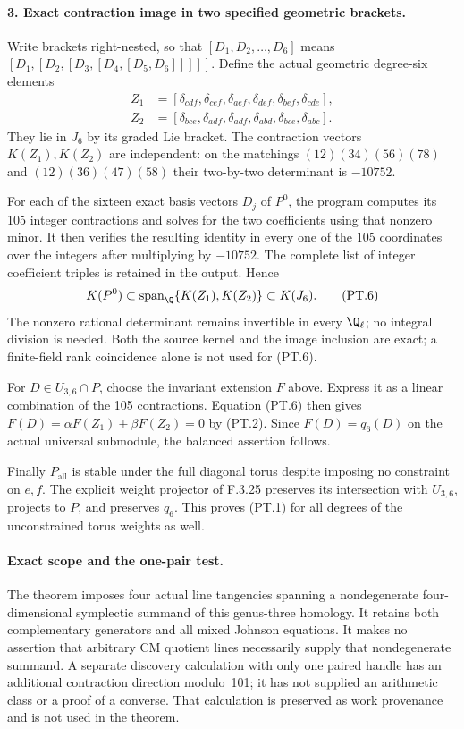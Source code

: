 \paragraph{3. Exact contraction image in two specified geometric brackets.}
Write brackets right-nested, so that
$[D_1,D_2,\ldots,D_6]$ means
$[D_1,[D_2,[D_3,[D_4,[D_5,D_6]]]]]$.
Define the actual geometric degree-six elements
\[
\begin{split}
 Z_1&=[\delta_{cdf},\delta_{cef},\delta_{aef},
          \delta_{def},\delta_{bef},\delta_{cde}],\\
 Z_2&=[\delta_{bce},\delta_{adf},\delta_{adf},
          \delta_{abd},\delta_{bce},\delta_{abc}].
\end{split}                                               \tag{PT.5}
\]
They lie in $J_6$ by its graded Lie bracket.
The contraction vectors $K(Z_1),K(Z_2)$ are
independent: on the matchings
$(12)(34)(56)(78)$ and $(12)(36)(47)(58)$
their two-by-two determinant is $-10752$.

For each of the sixteen exact basis vectors
$D_j$ of $P^0$, the program computes its
105 integer contractions and solves for the
two coefficients using that nonzero minor.
It then verifies the resulting identity in
every one of the 105 coordinates over the
integers after multiplying by $-10752$.
The complete list of integer coefficient
triples is retained in the output. Hence
\[
       K(P^0)\subset\operatorname{span}_{\Q}
                         \{K(Z_1),K(Z_2)\}\subset K(J_6).
                                                               \tag{PT.6}
\]
The nonzero rational determinant remains invertible
in every $\Q_\ell$; no integral division is needed.
Both the source kernel and the image inclusion
are exact; a finite-field rank coincidence
alone is not used for (PT.6).

For $D\in U_{3,6}\cap P$, choose the invariant
extension $F$ above. Express it as a linear
combination of the 105 contractions. Equation
(PT.6) then gives
$F(D)=\alpha F(Z_1)+\beta F(Z_2)=0$
by (PT.2). Since $F(D)=q_6(D)$ on the actual
universal submodule, the balanced assertion follows.

Finally $P_{\mathrm{all}}$ is stable under the
full diagonal torus despite imposing no
constraint on $e,f$. The explicit weight
projector of F.3.25 preserves its intersection
with $U_{3,6}$, projects to $P$, and preserves
$q_6$. This proves (PT.1) for all degrees of
the unconstrained torus weights as well.

\paragraph{Exact scope and the one-pair test.}
The theorem imposes four actual line tangencies
spanning a nondegenerate four-dimensional
symplectic summand of this genus-three homology.
It retains both complementary generators and
all mixed Johnson equations. It makes no
assertion that arbitrary CM quotient lines
necessarily supply that nondegenerate summand.
A separate discovery calculation with only
one paired handle has an additional contraction
direction modulo~101; it has not supplied an
arithmetic class or a proof of a converse.
That calculation is preserved as work provenance
and is not used in the theorem.
